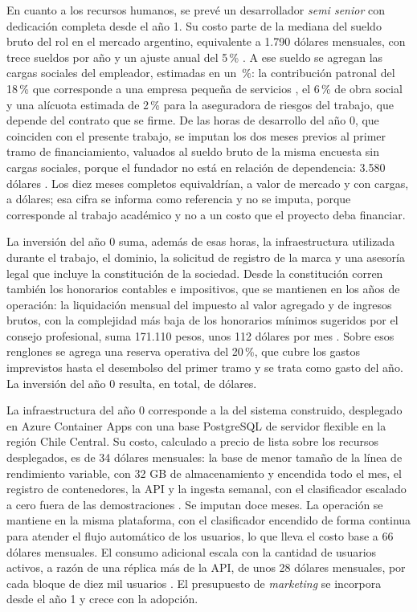 En cuanto a los recursos humanos, se prevé un desarrollador \textit{semi senior} con dedicación completa desde el año 1. Su costo parte de la mediana del sueldo bruto del rol en el mercado argentino, equivalente a 1.790 dólares mensuales, con trece sueldos por año y un ajuste anual del 5\,\% \parencite{Sysarmy2026}. A ese sueldo se agregan las cargas sociales del empleador, estimadas en un \finCargasSociales\,\%: la contribución patronal del 18\,\% que corresponde a una empresa pequeña de servicios \parencite{CongresoNacion2019}, el 6\,\% de obra social y una alícuota estimada de 2\,\% para la aseguradora de riesgos del trabajo, que depende del contrato que se firme. De las horas de desarrollo del año 0, que coinciden con el presente trabajo, se imputan los dos meses previos al primer tramo de financiamiento, valuados al sueldo bruto de la misma encuesta sin cargas sociales, porque el fundador no está en relación de dependencia: 3.580 dólares \parencite{Sysarmy2026}. Los diez meses completos equivaldrían, a valor de mercado y con cargas, a \finHorasAnioCero{} dólares; esa cifra se informa como referencia y no se imputa, porque corresponde al trabajo académico y no a un costo que el proyecto deba financiar.

La inversión del año 0 suma, además de esas horas, la infraestructura utilizada durante el trabajo, el dominio, la solicitud de registro de la marca y una asesoría legal que incluye la constitución de la sociedad. Desde la constitución corren también los honorarios contables e impositivos, que se mantienen en los años de operación: la liquidación mensual del impuesto al valor agregado y de ingresos brutos, con la complejidad más baja de los honorarios mínimos sugeridos por el consejo profesional, suma 171.110 pesos, unos 112 dólares por mes \parencite{CPCESantaFe2026}. Sobre esos renglones se agrega una reserva operativa del 20\,\%, que cubre los gastos imprevistos hasta el desembolso del primer tramo y se trata como gasto del año. La inversión del año 0 resulta, en total, de \finNeuInversion{} dólares.

La infraestructura del año 0 corresponde a la del sistema construido, desplegado en Azure Container Apps con una base PostgreSQL de servidor flexible en la región Chile Central. Su costo, calculado a precio de lista sobre los recursos desplegados, es de 34 dólares mensuales: la base de menor tamaño de la línea de rendimiento variable, con 32 GB de almacenamiento y encendida todo el mes, el registro de contenedores, la API y la ingesta semanal, con el clasificador escalado a cero fuera de las demostraciones \parencite{MicrosoftAzure2026, MicrosoftAzureContainerApps2026, MicrosoftAzureRegistro2026}. Se imputan doce meses. La operación se mantiene en la misma plataforma, con el clasificador encendido de forma continua para atender el flujo automático de los usuarios, lo que lleva el costo base a 66 dólares mensuales. El consumo adicional escala con la cantidad de usuarios activos, a razón de una réplica más de la API, de unos 28 dólares mensuales, por cada bloque de diez mil usuarios \parencite{MicrosoftAzureContainerApps2026}. El presupuesto de \textit{marketing} se incorpora desde el año 1 y crece con la adopción.

